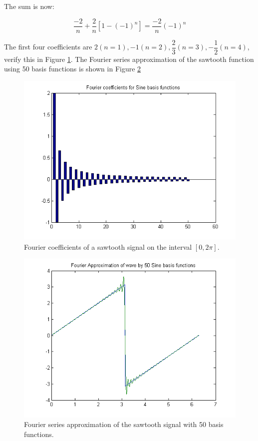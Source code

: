 \documentclass[11pt,letterpaper]{article}
\begin{document}
The sum is now:

\begin{equation}\label{HW_FourierSeries13}
 \dfrac{-2}{n} + \dfrac{2}{n}\left[ 1 - (-1)^n \right] = \dfrac{-2}{n}(-1)^n
\end{equation}

The first four coefficients are $2 (n=1), -1 (n=2), \dfrac{2}{3} (n=3), - \dfrac{1}{2} (n=4)$, verify this in Figure \ref{fig:HW_FourierSeries5}. The Fourier series approximation of the sawtooth function using 50 basis functions is shown in Figure \ref{fig:HW_FourierSeries6}\\

\begin{figure}
\centering
\includegraphics[width=0.7\linewidth]{HW_FourierSeries5}
\caption{Fourier coefficients of a sawtooth signal on the interval $[0, 2 \pi]$.}
\label{fig:HW_FourierSeries5}
\end{figure}

\begin{figure}
\centering
\includegraphics[width=0.7\linewidth]{HW_FourierSeries6}
\caption{Fourier series approximation of the sawtooth signal with 50 basis functions.}
\label{fig:HW_FourierSeries6}
\end{figure}
\end{document}
